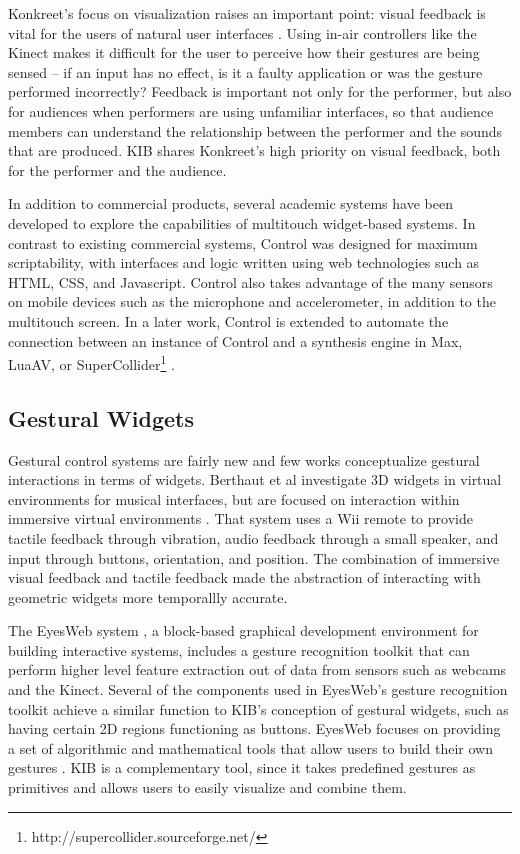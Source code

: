 \documentclass{nime-alternate}
\begin{document}
Konkreet's focus on visualization raises an important point: visual feedback is
vital for the users of natural user interfaces \cite{bravenuiworld}. Using in-air controllers like the Kinect
makes it difficult for the user to perceive how their gestures are being sensed -- if an input has no effect, is it
a faulty application or was the gesture performed incorrectly? Feedback is important not only for the performer, but
also for audiences when performers are using unfamiliar interfaces, so that audience members can understand the relationship
between the performer and the sounds that are produced. KIB shares Konkreet's high priority on visual feedback, both for the performer and the audience. 

In addition to commercial products, several academic systems have been developed to explore the capabilities of multitouch
widget-based systems. In contrast to existing commercial systems, Control \cite{roberts2011control} was designed for maximum 
scriptability, with interfaces and logic written using web technologies such as HTML, CSS, and Javascript. 
Control also takes advantage of the many sensors on mobile devices such
as the microphone and accelerometer, in addition to the multitouch screen. In a later work, Control is 
extended to automate the connection between an instance of Control and a synthesis engine in Max, LuaAV\cite{wakefield2010luaav},
or SuperCollider\footnote{http://supercollider.sourceforge.net/} \cite{roberts2012mobile}.

\subsection{Gestural Widgets}
Gestural control systems are fairly new and few works conceptualize gestural interactions in terms of widgets. Berthaut et al investigate 3D widgets in virtual environments for musical
interfaces, but are focused on interaction within immersive virtual environments \cite{berthaut2011interacting}. That system uses a Wii remote to provide tactile feedback through vibration,
audio feedback through a small speaker, and input through buttons, orientation, and position. The combination of immersive visual feedback and tactile feedback made the abstraction
of interacting with geometric widgets more temporallly accurate.

The EyesWeb system \cite{camurri2000eyesweb}, a block-based graphical development environment for building
interactive systems, includes a gesture recognition toolkit that can perform higher level
feature extraction out of data from sensors such as webcams and the Kinect. Several of the components
used in EyesWeb's gesture recognition toolkit achieve a similar function to KIB's conception of gestural widgets, such as
having certain 2D regions functioning as buttons. EyesWeb focuses on providing a set of algorithmic
and mathematical tools that allow users to build their own gestures \cite{gillian2011machine}. KIB is a complementary
tool, since it takes predefined gestures as primitives and allows users to easily visualize and combine them.
\end{document}
